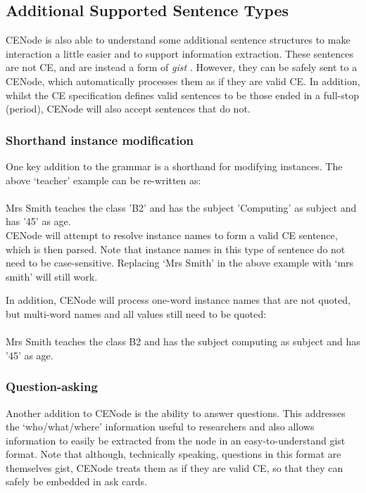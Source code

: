 \documentclass{scrartcl}
\newcommand{\ce}[1]{\textsf{#1}}
\begin{document}
\subsection{Additional Supported Sentence Types}
CENode is also able to understand some additional sentence structures to make interaction a little easier and to support information extraction. These sentences are not CE, and are instead a form of \textit{gist} \cite{preece14hmc}. However, they can be safely sent to a CENode, which automatically processes them as if they are valid CE. In addition, whilst the CE specification defines valid sentences to be those ended in a full-stop (period), CENode will also accept sentences that do not.


\subsubsection{Shorthand instance modification}

One key addition to the grammar is a shorthand for modifying instances. The above `teacher' example can be re-written as:\\
\\\ce{Mrs Smith teaches the class 'B2' and has the subject 'Computing' as subject and has '45' as age.}\\

CENode will attempt to resolve instance names to form a valid CE sentence, which is then parsed. Note that instance names in this type of sentence do not need to be case-sensitive. Replacing `Mrs Smith' in the above example with `mrs smith' will still work.

In addition, CENode will process one-word instance names that are not quoted, but multi-word names and all values still need to be quoted:\\
\\\ce{Mrs Smith teaches the class B2 and has the subject computing as subject and has '45' as age.}

\subsubsection{Question-asking}

Another addition to CENode is the ability to answer questions. This addresses the `who/what/where' information useful to researchers and also allows information to easily be extracted from the node in an easy-to-understand gist format. Note that although, technically speaking, questions in this format are themselves gist, CENode treats them as if they are valid CE, so that they can safely be embedded in \ce{ask card}s.
\end{document}
